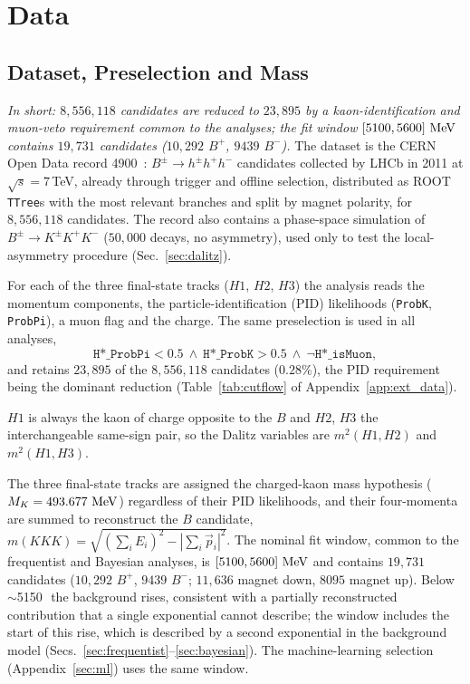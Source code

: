 \section{Data}
\label{sec:data}

\subsection{Dataset, Preselection and Mass}
\label{sec:data_presel}
\emph{In short: $8{,}556{,}118$ candidates are reduced to $23{,}895$ by a kaon-identification and muon-veto requirement common to the analyses; the fit window $[5100,5600]\,\,\text{Me\hspace{-.08em}V}$ contains $19{,}731$ candidates ($10{,}292$ $B^+$, $9439$ $B^-$).}
The dataset is the CERN Open Data record 4900~\cite{opendata_record}: $B^{\pm}\to h^{\pm}h^{+}h^{-}$ candidates collected by LHCb in 2011 at $\sqrt{s}=7$\,TeV, already through trigger and offline selection, distributed as ROOT \texttt{TTree}s with the most relevant branches and split by magnet polarity, for $8{,}556{,}118$ candidates. The record also contains a phase-space simulation of $B^{\pm}\to K^{\pm}K^{+}K^{-}$ ($50{,}000$ decays, no asymmetry), used only to test the local-asymmetry procedure (Sec.~\ref{sec:dalitz}).


For each of the three final-state tracks ($H1$, $H2$, $H3$) the analysis reads the momentum components, the particle-identification (PID) likelihoods (\texttt{ProbK}, \texttt{ProbPi}), a muon flag and the charge. The same preselection is used in all analyses,
\[
\texttt{H*\_ProbPi} < 0.5 \ \wedge\ \texttt{H*\_ProbK} > 0.5 \ \wedge\ \lnot\texttt{H*\_isMuon},
\]
and retains $23{,}895$ of the $8{,}556{,}118$ candidates ($0.28\%$), the PID requirement being the dominant reduction (Table~\ref{tab:cutflow} of Appendix~\ref{app:ext_data}).

$H1$ is always the kaon of charge opposite to the $B$ and $H2$, $H3$ the interchangeable same-sign pair, so the Dalitz variables are $m^2(H1,H2)$ and $m^2(H1,H3)$.

\label{sec:data_mass}
The three final-state tracks are assigned the charged-kaon mass hypothesis ($M_K=493.677\,\,\text{Me\hspace{-.08em}V}$) regardless of their PID likelihoods, and their four-momenta are summed to reconstruct the $B$ candidate, $m(KKK)=\sqrt{(\sum_i E_i)^2-|\sum_i \vec{p}_i|^2}$. The nominal fit window, common to the frequentist and Bayesian analyses, is $[5100,5600]\,\,\text{Me\hspace{-.08em}V}$ and contains $19{,}731$ candidates ($10{,}292$ $B^+$, $9439$ $B^-$; $11{,}636$ magnet down, $8095$ magnet up). Below $\sim$5150\,\MeV\ the background rises, consistent with a partially reconstructed contribution that a single exponential cannot describe; the window includes the start of this rise, which is described by a second exponential in the background model (Secs.~\ref{sec:frequentist}--\ref{sec:bayesian}). The machine-learning selection (Appendix~\ref{sec:ml}) uses the same window.

